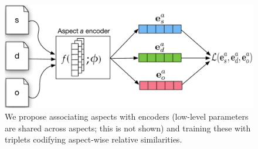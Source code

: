 \documentclass[11pt,a4paper]{article}
\begin{document}
\begin{figure}
	\centering
    \includegraphics[scale=.425]{figures/disentangle.pdf}
    \vspace{-1.5em}
    \caption{We propose associating aspects with encoders (low-level parameters are shared across aspects; this is not shown) and training these with triplets codifying aspect-wise relative similarities.}%
    \label{fig:the-idea}
    \vspace{-.75em}
\end{figure}








\end{document}
